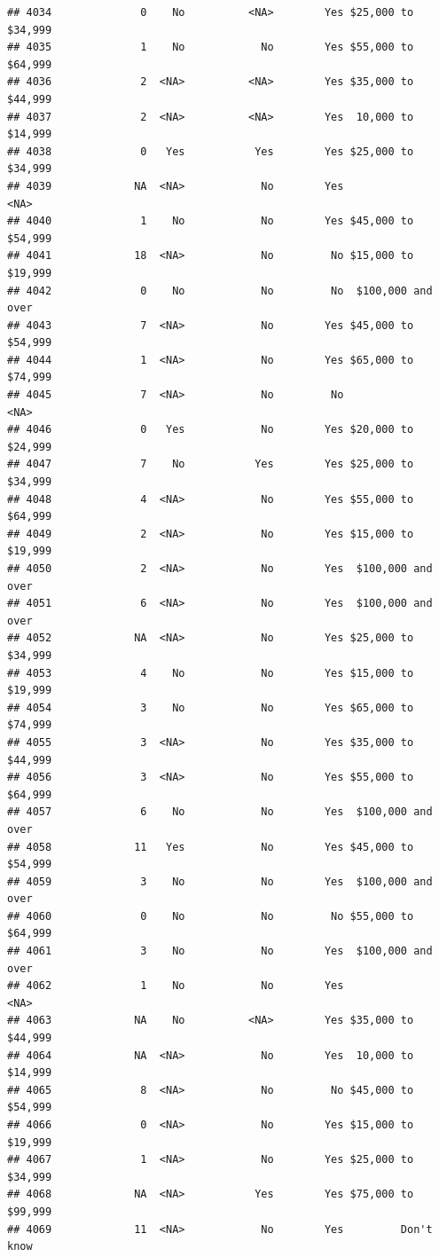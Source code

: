 \documentclass[man]{apa6}
\begin{document}
\begin{verbatim}
## 4034              0    No          <NA>        Yes $25,000 to $34,999
## 4035              1    No            No        Yes $55,000 to $64,999
## 4036              2  <NA>          <NA>        Yes $35,000 to $44,999
## 4037              2  <NA>          <NA>        Yes  10,000 to $14,999
## 4038              0   Yes           Yes        Yes $25,000 to $34,999
## 4039             NA  <NA>            No        Yes               <NA>
## 4040              1    No            No        Yes $45,000 to $54,999
## 4041             18  <NA>            No         No $15,000 to $19,999
## 4042              0    No            No         No  $100,000 and over
## 4043              7  <NA>            No        Yes $45,000 to $54,999
## 4044              1  <NA>            No        Yes $65,000 to $74,999
## 4045              7  <NA>            No         No               <NA>
## 4046              0   Yes            No        Yes $20,000 to $24,999
## 4047              7    No           Yes        Yes $25,000 to $34,999
## 4048              4  <NA>            No        Yes $55,000 to $64,999
## 4049              2  <NA>            No        Yes $15,000 to $19,999
## 4050              2  <NA>            No        Yes  $100,000 and over
## 4051              6  <NA>            No        Yes  $100,000 and over
## 4052             NA  <NA>            No        Yes $25,000 to $34,999
## 4053              4    No            No        Yes $15,000 to $19,999
## 4054              3    No            No        Yes $65,000 to $74,999
## 4055              3  <NA>            No        Yes $35,000 to $44,999
## 4056              3  <NA>            No        Yes $55,000 to $64,999
## 4057              6    No            No        Yes  $100,000 and over
## 4058             11   Yes            No        Yes $45,000 to $54,999
## 4059              3    No            No        Yes  $100,000 and over
## 4060              0    No            No         No $55,000 to $64,999
## 4061              3    No            No        Yes  $100,000 and over
## 4062              1    No            No        Yes               <NA>
## 4063             NA    No          <NA>        Yes $35,000 to $44,999
## 4064             NA  <NA>            No        Yes  10,000 to $14,999
## 4065              8  <NA>            No         No $45,000 to $54,999
## 4066              0  <NA>            No        Yes $15,000 to $19,999
## 4067              1  <NA>            No        Yes $25,000 to $34,999
## 4068             NA  <NA>           Yes        Yes $75,000 to $99,999
## 4069             11  <NA>            No        Yes         Don't know

\end{verbatim}
\end{document}
